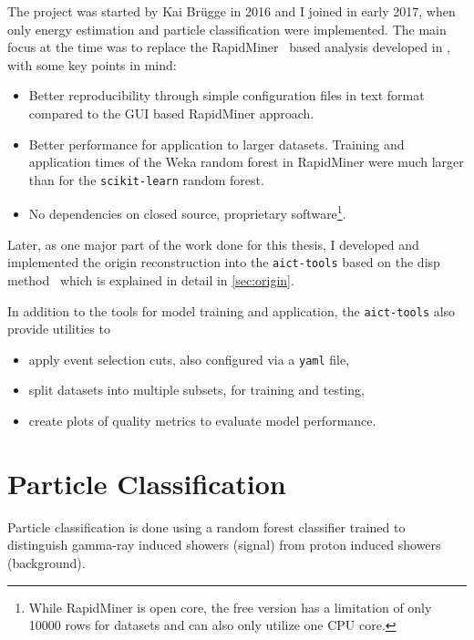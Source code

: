 The project was started by Kai Brügge in 2016 and I joined in early 2017, 
when only energy estimation and particle classification were implemented.
The main focus at the time was to replace the RapidMiner~\cite{rapidminer} based
analysis developed in \cite{phd-temme}, with some key points in mind:
\begin{itemize}[nosep]
  \item Better reproducibility through simple configuration files in text format
    compared to the GUI based RapidMiner approach.
  \item Better performance for application to larger datasets.
    Training and application times of the Weka random forest in RapidMiner
    were much larger than for the \texttt{scikit-learn} random forest.
  \item No dependencies on closed source, proprietary software\footnote{While RapidMiner is
    open core, the free version has a limitation of only \num{10000} rows for datasets
    and can also only utilize one CPU core.}.
\end{itemize}
Later, as one major part of the work done for this thesis, I developed and
implemented the origin reconstruction into the \texttt{aict-tools} based on
the disp method~\cite{disp} which is explained in detail in \autoref{sec:origin}.

In addition to the tools for model training and application, the \texttt{aict-tools} also
provide  utilities to
\begin{itemize}[nosep]
  \item apply event selection cuts, also configured via a \texttt{yaml} file,
  \item split datasets into multiple subsets, \eg for training and testing,
  \item create plots of quality metrics to evaluate model performance.
\end{itemize}

\section{Particle Classification}\label{sec:classification}

Particle classification is done using a random forest classifier trained
to distinguish gamma-ray induced showers (signal) from proton induced
showers (background). 

